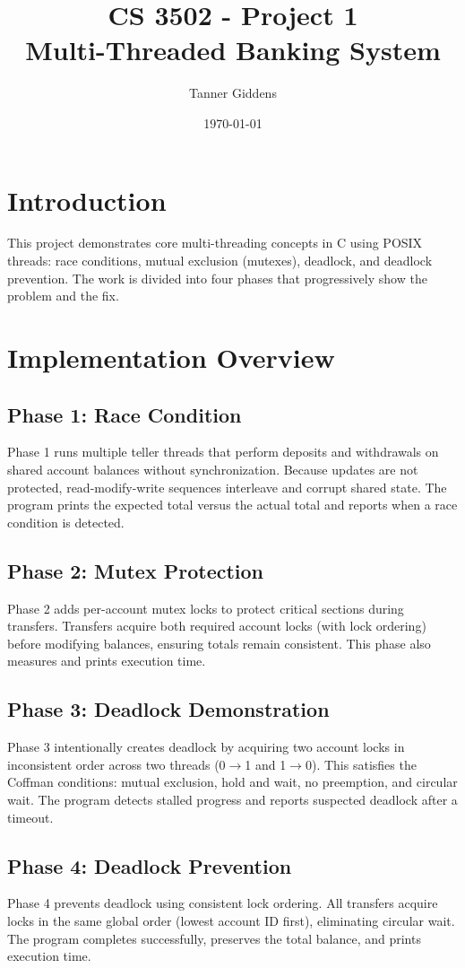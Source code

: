 \documentclass[12pt]{article}
\title{CS 3502 - Project 1 \\ Multi-Threaded Banking System}
\author{Tanner Giddens}
\date{\today}
\begin{document}
\maketitle

\section{Introduction}
This project demonstrates core multi-threading concepts in C using POSIX threads:
race conditions, mutual exclusion (mutexes), deadlock, and deadlock prevention.
The work is divided into four phases that progressively show the problem and the fix.

\section{Implementation Overview}

\subsection{Phase 1: Race Condition}
Phase 1 runs multiple teller threads that perform deposits and withdrawals on shared
account balances without synchronization. Because updates are not protected,
read-modify-write sequences interleave and corrupt shared state. The program prints
the expected total versus the actual total and reports when a race condition is detected.

\subsection{Phase 2: Mutex Protection}
Phase 2 adds per-account mutex locks to protect critical sections during transfers.
Transfers acquire both required account locks (with lock ordering) before modifying balances,
ensuring totals remain consistent. This phase also measures and prints execution time.

\subsection{Phase 3: Deadlock Demonstration}
Phase 3 intentionally creates deadlock by acquiring two account locks in inconsistent order
across two threads (0$\rightarrow$1 and 1$\rightarrow$0). This satisfies the Coffman conditions:
mutual exclusion, hold and wait, no preemption, and circular wait. The program detects
stalled progress and reports suspected deadlock after a timeout.

\subsection{Phase 4: Deadlock Prevention}
Phase 4 prevents deadlock using consistent lock ordering. All transfers acquire locks in the
same global order (lowest account ID first), eliminating circular wait. The program completes
successfully, preserves the total balance, and prints execution time.
\end{document}
